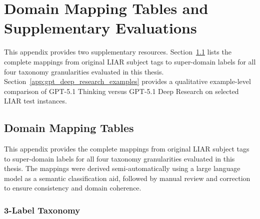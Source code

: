 \chapter{Domain Mapping Tables and Supplementary Evaluations}
This appendix provides two supplementary resources. Section~\ref{app:domain_mapping} lists the complete mappings from original LIAR subject tags to super-domain labels for all four taxonomy granularities evaluated in this thesis.
Section~\ref{app:gpt_deep_research_examples} provides a qualitative example-level comparison of GPT-5.1 Thinking versus GPT-5.1 Deep Research on selected LIAR test instances.

\section{Domain Mapping Tables}
\label{app:domain_mapping}

This appendix provides the complete mappings from original LIAR subject tags to super-domain labels for all four taxonomy granularities evaluated in this thesis. The mappings were derived semi-automatically using a large language model as a semantic classification aid, followed by manual review and correction to ensure consistency and domain coherence.

\subsection{3-Label Taxonomy}
\label{app:domain_mapping_3}


